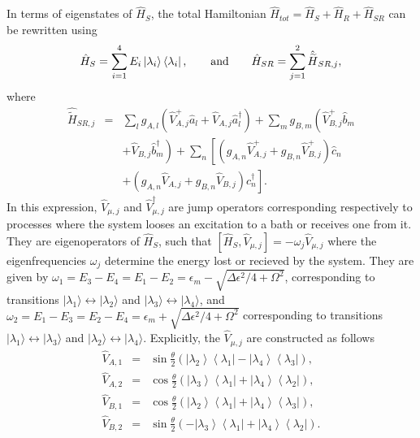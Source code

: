 \documentclass[12pt]{iopart}
\newcommand{\ket}[1]{|#1\rangle}
\begin{document}
In terms of eigenstates of $\hat{H}_{S}$, the total Hamiltonian $\hat{H}_{tot}=\hat{H}_{S}+\hat{H}_{R}+\hat{H}_{SR}$ can be rewritten using
\begin{equation}
\label{HSdiag}
\hat{H}_{S}=\sum_{i=1}^{4}E_{i}\left|\lambda _{i}\right\rangle\left\langle\lambda _{i}\right| , \hspace{0.7cm} \mathrm{and} \hspace{0.7cm} \hat{H}_{SR} = \sum_{j=1}^{2}\hat{\widetilde{H}}_{SR,j} ,
\end{equation}
where
\begin{eqnarray}\label{HSRj}
\hat{\widetilde{H}}_{SR,j}&=&\sum_{l}g_{A,l}\left(\hat{V}^{+}_{A,j}\hat{a}_{l}+\hat{V}_{A,j}\hat{a}_{l}^{\dag}\right)
+\sum_{m}g_{B,m}\left(\hat{V}^{+}_{B,j}\hat{b}_{m}\right.\nonumber\\
&&\left.+\hat{V}_{B,j}\hat{b}_{m}^{\dag}\right)
+\sum_{n}\left[\left(g_{A,n}\hat{V}^{+}_{A,j}+g_{B,n}\hat{V}^{+}_{B,j}\right)\hat{c}_{n}\right. \\
&&\left.+\left(g_{A,n}\hat{V}_{A,j}+g_{B,n}\hat{V}_{B,j}\right)\hat{c}_{n}^{\dag}\right] . \nonumber
\end{eqnarray}
In this expression, $\hat{V}_{\mu,j}$ and $\hat{V}^{\dagger}_{\mu,j}$ are jump operators corresponding respectively to processes where the system looses an excitation to a bath or receives one from it. They are eigenoperators of $\hat{H}_{S}$, such that $[\hat{H}_{S},\hat{V}_{\mu,j}]=-\omega_{j}\hat{V}_{\mu,j}$ where the eigenfrequencies $\omega_{j}$ determine the energy lost or recieved by the system. They are given by $\omega_1 = E_3 - E_4 = E_1 - E_2 =\epsilon_{m} - \sqrt{\Delta\epsilon^2/4 + \Omega^2}$, corresponding to transitions $\ket{\lambda_1}\leftrightarrow\ket{\lambda_2}$ and $\ket{\lambda_3}\leftrightarrow\ket{\lambda_4}$, and $\omega_2 = E_1 - E_3 = E_2 - E_4 = \epsilon_{m} + \sqrt{\Delta\epsilon^2/4 + \Omega^2}$ corresponding to transitions $\ket{\lambda_1}\leftrightarrow\ket{\lambda_3}$ and $\ket{\lambda_2}\leftrightarrow\ket{\lambda_4}$. Explicitly, the $\hat{V}_{\mu,j}$ are constructed as follows
\begin{eqnarray}
\hat{V}_{A,1} &=& \sin \frac{\theta }{2}(\left| \lambda _{2} \right\rangle \left\langle {{\lambda _1}} \right| - \left| {{\lambda _4}} \right\rangle \left\langle {{\lambda _3}} \right|) , \nonumber \\
{\hat{V}_{A,2}} &=& \cos \frac{\theta }{2}(\left| {{\lambda _3}} \right\rangle \left\langle {{\lambda _1}} \right| + \left| {{\lambda _4}} \right\rangle \left\langle {{\lambda _2}} \right|) , \nonumber \\
{\hat{V}_{B,1}} &=& \cos \frac{\theta }{2}(\left| {{\lambda _2}} \right\rangle \left\langle {{\lambda _1}} \right| + \left| {{\lambda _4}} \right\rangle \left\langle {{\lambda _3}} \right|) , \nonumber \\
{\hat{V}_{B,2}} &=& \sin \frac{\theta }{2}( - \left| {{\lambda _3}} \right\rangle \left\langle {{\lambda _1}} \right| + \left| {{\lambda _4}} \right\rangle \left\langle {{\lambda _2}} \right|).
\end{eqnarray}
\end{document}
